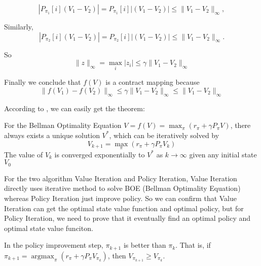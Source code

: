 \begin{equation*}
    |P_{\pi_{1}}[i](V_{1}-V_{2})|=P_{\pi_{1}}[i]|(V_{1}-V_{2})|\le\|V_{1}-V_{2}\|_{\infty},
\end{equation*}

Similarly,
\begin{equation*}
    |P_{\pi_{2}}[i](V_{1}-V_{2})|=P_{\pi_{2}}[i]|(V_{1}-V_{2})|\le\|V_{1}-V_{2}\|_{\infty}.
\end{equation*}

So
\begin{equation*}
    \|z\|_{\infty}=\max_{i}|z_{i}|\le\gamma\|V_{1}-V_{2}\|_{\infty}
\end{equation*}

Finally we conclude that $f(V)$ is a contract mapping because
\begin{equation*}
    \|f(V_{1})-f(V_{2})\|_{\infty}\le\gamma\|V_{1}-V_{2}\|_{\infty}\le\|V_{1}-V_{2}\|_{\infty}
\end{equation*}

According to , we can easily get the theorem:
\begin{theorem}
    For the Bellman Optimality Equation $V=f(V)=\max_{\pi}(r_{\pi}+\gamma P_{\pi}V)$, there always exists a unique solution $V^*$, which can be iteratively solved by
    \begin{equation}
        V_{k+1}=\max_{\pi}(r_{\pi}+\gamma P_{\pi}V_{k})
    \end{equation}
    The value of $V_{k}$ is converged exponentially to $V^*$ as $k\to \infty$ given any initial state $V_{0}$
\end{theorem}

For the two algorithm Value Iteration and Policy Iteration, Value Iteration directly uses iterative method to solve BOE (Bellman Optimality Equation) whereas Policy Iteration just improve policy. So we can confirm that Value Iteration can get the optimal state value function and optimal policy, but for Policy Iteration, we need to prove that it eventually find an optimal policy and optimal state value funciton.

\begin{lemma}\label{lem:policy-improve}
    In the policy improvement step, $\pi_{k+1}$ is better than $\pi_{k}$. That is, if $\pi_{k+1}=\mathop{\arg\max}_{\pi}(r_{\pi}+\gamma P_{\pi}V_{\pi_{k}})$, then $V_{\pi_{k+1}} \ge V_{\pi_{k}}$. 
\end{lemma}

